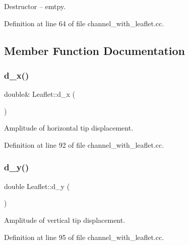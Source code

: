 Destructor -- emtpy. 



Definition at line 64 of file channel\+\_\+with\+\_\+leaflet.\+cc.



\subsection{Member Function Documentation}
\mbox{\label{classLeaflet_a48e4d16790ffd9de527093eac8ff566c}} 
\subsubsection{\texorpdfstring{d\+\_\+x()}{d\_x()}}
{\footnotesize\ttfamily double\& Leaflet\+::d\+\_\+x (\begin{DoxyParamCaption}{ }\end{DoxyParamCaption})\hspace{0.3cm}{\ttfamily [inline]}}



Amplitude of horizontal tip displacement. 



Definition at line 92 of file channel\+\_\+with\+\_\+leaflet.\+cc.

\mbox{\label{classLeaflet_a8ff8044a3da540c7c9d7a89790b6ee58}} 
\subsubsection{\texorpdfstring{d\+\_\+y()}{d\_y()}}
{\footnotesize\ttfamily double Leaflet\+::d\+\_\+y (\begin{DoxyParamCaption}{ }\end{DoxyParamCaption})\hspace{0.3cm}{\ttfamily [inline]}}



Amplitude of vertical tip displacement. 



Definition at line 95 of file channel\+\_\+with\+\_\+leaflet.\+cc.

\mbox{\label{classLeaflet_a7a28827b7081107ac9e33087598ca868}} 
